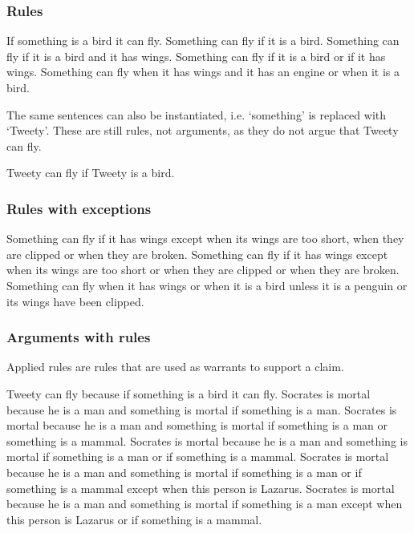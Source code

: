 \subsubsection{Rules}
\begin{exe}
\ex\label{e72} If something is a bird it can fly.
\ex\label{e73} Something can fly if it is a bird.
\ex\label{e74} Something can fly if it is a bird and it has wings.
\ex\label{e75} Something can fly if it is a bird or if it has wings.
\ex\label{e76} Something can fly when it has wings and it has an engine or when it is a bird.
\end{exe}

\noindent The same sentences can also be instantiated, i.e. `something' is replaced with `Tweety'. These are still rules, not arguments, as they do not argue that Tweety can fly.
\begin{exe}
\ex\label{e77} Tweety can fly if Tweety is a bird.
\end{exe}

\subsubsection{Rules with exceptions}
\begin{exe}
\ex\label{e80} Something can fly if it has wings except when its wings are too short, when they are clipped or when they are broken.
\ex\label{e81} Something can fly if it has wings except when its wings are too short or when they are clipped or when they are broken.
\ex\label{e82} Something can fly when it has wings or when it is a bird unless it is a penguin or its wings have been clipped. 
\end{exe}

\subsubsection{Arguments with rules}
Applied rules are rules that are used as warrants to support a claim.
\begin{exe}
\ex\label{e90} Tweety can fly because if something is a bird it can fly.
\ex\label{e91} Socrates is mortal because he is a man and something is mortal if something is a man.
\ex\label{e92} Socrates is mortal because he is a man and something is mortal if something is a man or something is a mammal.
\ex\label{e93} Socrates is mortal because he is a man and something is mortal if something is a man or if something is a mammal.
\ex\label{e94} Socrates is mortal because he is a man and something is mortal if something is a man or if something is a mammal except when this person is Lazarus.
\ex\label{e95} Socrates is mortal because he is a man and something is mortal if something is a man except when this person is Lazarus or if something is a mammal.
\end{exe}

